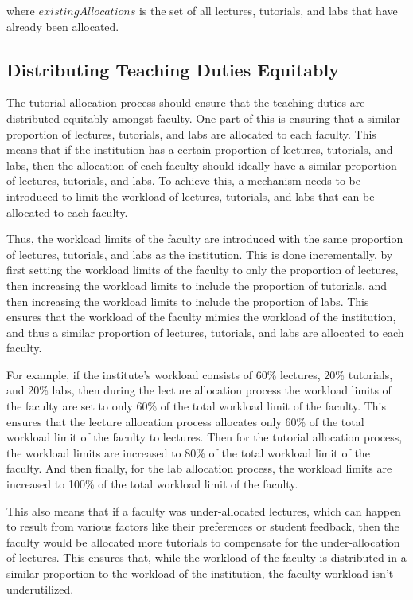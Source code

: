 where $existingAllocations$ is the set of all lectures, tutorials, and labs that have already been allocated.

\subsection{Distributing Teaching Duties Equitably}
\label{sec:workload_limits}

The tutorial allocation process should ensure that the teaching duties are distributed equitably amongst faculty. One part of this is ensuring that a similar proportion of lectures, tutorials, and labs are allocated to each faculty. This means that if the institution has a certain proportion of lectures, tutorials, and labs, then the allocation of each faculty should ideally have a similar proportion of lectures, tutorials, and labs. To achieve this, a mechanism needs to be introduced to limit the workload of lectures, tutorials, and labs that can be allocated to each faculty.

Thus, the workload limits of the faculty are introduced with the same proportion of lectures, tutorials, and labs as the institution. This is done incrementally, by first setting the workload limits of the faculty to only the proportion of lectures, then increasing the workload limits to include the proportion of tutorials, and then increasing the workload limits to include the proportion of labs. This ensures that the workload of the faculty mimics the workload of the institution, and thus a similar proportion of lectures, tutorials, and labs are allocated to each faculty.

For example, if the institute's workload consists of 60\% lectures, 20\% tutorials, and 20\% labs, then during the lecture allocation process the workload limits of the faculty are set to only 60\% of the total workload limit of the faculty. This ensures that the lecture allocation process allocates only 60\% of the total workload limit of the faculty to lectures. Then for the tutorial allocation process, the workload limits are increased to 80\% of the total workload limit of the faculty. And then finally, for the lab allocation process, the workload limits are increased to 100\% of the total workload limit of the faculty.

This also means that if a faculty was under-allocated lectures, which can happen to result from various factors like their preferences or student feedback, then the faculty would be allocated more tutorials to compensate for the under-allocation of lectures. This ensures that, while the workload of the faculty is distributed in a similar proportion to the workload of the institution, the faculty workload isn't underutilized.


